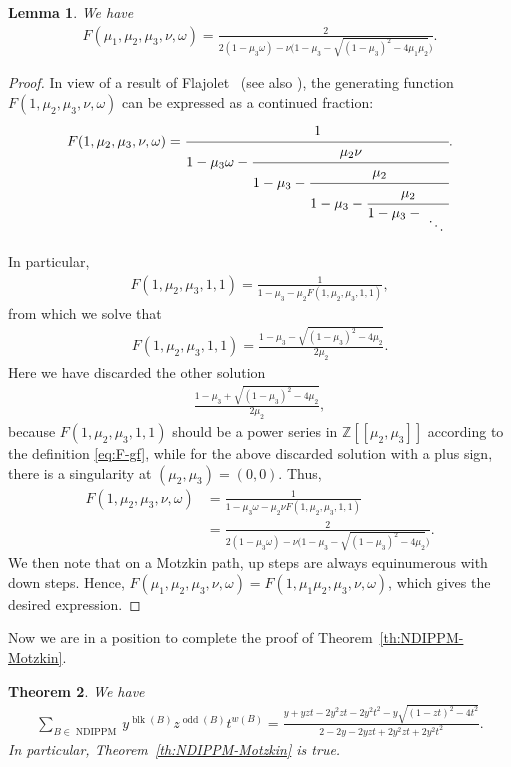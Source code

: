 \documentclass[12pt,reqno]{amsart}
\numberwithin{equation}{section}
\theoremstyle{theorem}
\newtheorem{theorem}{Theorem}[section]
\newtheorem{lemma}[theorem]{Lemma}
\theoremstyle{definition}
\theoremstyle{named}
\newcommand{\NDIPPM}{\operatorname{NDIPPM}}
\newcommand{\odd}{\operatorname{odd}}
\newcommand{\blk}{\operatorname{blk}}
\newcommand{\lastddots}{
	\raisebox{\dimexpr1ex-\height}{
		$\displaystyle
		\raisebox{.5\height}{$\ddots$}
		$
	}
}
\begin{document}
\begin{lemma}
	We have
	\begin{align}\label{eq:F-gf-explicit}
		F(\mu_1,\mu_2,\mu_3,\nu,\omega) = \frac{2}{2(1 - \mu_3 \omega) - \nu \big(1 - \mu_3 - \sqrt{(1-\mu_3)^2 - 4\mu_1\mu_2}\big)}.
	\end{align}
\end{lemma}

\begin{proof}
	In view of a result of Flajolet~\cite[p.~129, Theorem~1]{Fla1980} (see also \cite[p.~527, Theorem~A1]{Kra2001}), the generating function $F(1,\mu_2,\mu_3,\nu,\omega)$ can be expressed as a continued fraction:
	\begin{align*}
		F(1,\mu_2,\mu_3,\nu,\omega) = \cfrac{1}{1 - \mu_3 \omega -\cfrac{\mu_2 \nu}{1 - \mu_3 - \cfrac{\mu_2}{1 - \mu_3 - \cfrac{\mu_2}{1 - \mu_3 - \lastddots}}}}.
	\end{align*}
	In particular,
	\begin{align*}
		F(1,\mu_2,\mu_3,1,1) = \frac{1}{1 - \mu_3 - \mu_2 F(1,\mu_2,\mu_3,1,1)},
	\end{align*}
	from which we solve that
	\begin{align*}
		F(1,\mu_2,\mu_3,1,1) = \frac{1 - \mu_3 - \sqrt{(1-\mu_3)^2 - 4\mu_2}}{2\mu_2}.
	\end{align*}
	Here we have discarded the other solution
	\begin{align*}
		\frac{1 - \mu_3 + \sqrt{(1-\mu_3)^2 - 4\mu_2}}{2\mu_2},
	\end{align*}
	because $F(1,\mu_2,\mu_3,1,1)$ should be a power series in $\mathbb{Z}[[\mu_2,\mu_3]]$ according to the definition \eqref{eq:F-gf}, while for the above discarded solution with a plus sign, there is a singularity at $(\mu_2, \mu_3) = (0, 0)$.
	Thus,
	\begin{align*}
		F(1,\mu_2,\mu_3,\nu,\omega) &= \frac{1}{1 - \mu_3 \omega - \mu_2 \nu F(1,\mu_2,\mu_3,1,1)}\\
		&= \frac{2}{2(1 - \mu_3 \omega) - \nu \big(1 - \mu_3 - \sqrt{(1-\mu_3)^2 - 4\mu_2}\big)}.
	\end{align*}
	We then note that on a Motzkin path, up steps are always equinumerous with down steps. Hence, $F(\mu_1,\mu_2,\mu_3,\nu,\omega) = F(1,\mu_1 \mu_2,\mu_3,\nu,\omega)$, which gives the desired expression.
\end{proof}

Now we are in a position to complete the proof of Theorem~\ref{th:NDIPPM-Motzkin}.

\begin{theorem}
	We have
	\begin{align}\label{eq:NDIPPM-gf}
		\sum_{B \in \NDIPPM} y^{\blk(B)} z^{\odd(B)} t^{w(B)} = \frac{y + y z t - 2 y^2 z t - 2 y^2 t^2 - y \sqrt{(1-zt)^2 - 4t^2}}{2 - 2 y - 2 y z t + 2 y^2 z t + 2 y^2 t^2}.
	\end{align}
	In particular, Theorem~\ref{th:NDIPPM-Motzkin} is true.
\end{theorem}
\end{document}
